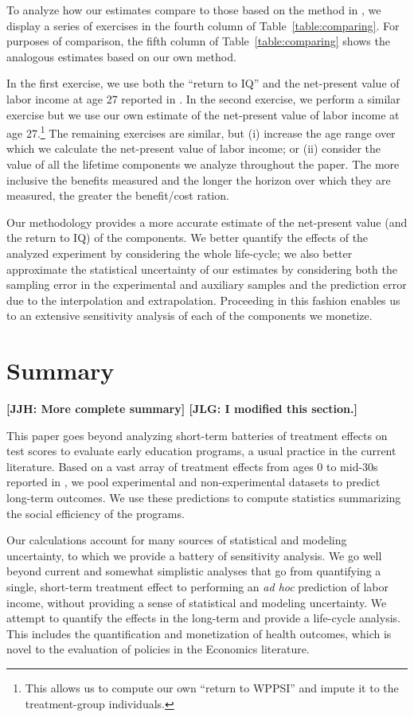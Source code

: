 To analyze how our estimates compare to those based on the method in \citet{Kline_Walters_2016_QJE}, we display a series of exercises in the fourth column of Table~\ref{table:comparing}. For purposes of comparison, the fifth column of Table~\ref{table:comparing} shows the analogous estimates based on our own method.

In the first exercise, we use both the ``return to IQ'' and the net-present value of labor income at age 27 reported in  \citet{Chetty_Friedman_etal_2011_QJoE}. In the second exercise, we perform a similar exercise but we use our own estimate of the net-present value of labor income at age 27.\footnote{This allows us to compute our own ``return to WPPSI'' and impute it to the treatment-group individuals.} The remaining exercises are similar, but (i) increase the age range over which we calculate the net-present value of labor income; or (ii) consider the value of all the lifetime components we analyze throughout the paper. The more inclusive the benefits measured and the longer the horizon over which they are measured, the greater the benefit/cost ration.

Our methodology provides a more accurate estimate of the net-present value (and the return to IQ) of the components. We better quantify the effects of the analyzed experiment by considering the whole life-cycle; we also better approximate the statistical uncertainty of our estimates by considering both the sampling error in the experimental and auxiliary samples and the prediction error due to the interpolation and extrapolation. Proceeding in this fashion enables us to an extensive sensitivity analysis of each of the components we monetize.

\section{Summary} \label{section:conclusion} \textbf{[JJH: More complete summary] [JLG: I modified this section.]}

This paper goes beyond analyzing short-term batteries of treatment effects on test scores to evaluate early education programs, a usual practice in the current literature. Based on a vast array of treatment effects from ages 0 to mid-30s reported in \citet{Garcia_Ziff_2017_Gender-Diff_UNPUBLISHED}, we pool experimental and non-experimental datasets to predict long-term outcomes. We use these predictions to compute statistics summarizing the social efficiency of the programs. 

Our calculations account for many sources of statistical and modeling uncertainty, to which we provide a battery of sensitivity analysis. We go well beyond current and somewhat simplistic analyses that go from quantifying a single, short-term treatment effect to performing an \textit{ad hoc} prediction of labor income, without providing a sense of statistical and modeling uncertainty. We attempt to quantify the effects in the long-term and provide a life-cycle analysis. This includes the quantification and monetization of health outcomes, which is novel to the evaluation of policies in the Economics literature.

